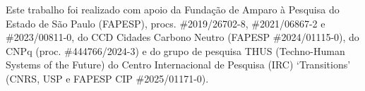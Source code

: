 \documentclass[12pt]{article}
\begin{document}
Este trabalho foi realizado com apoio da Fundação de Amparo à Pesquisa do Estado de São Paulo (FAPESP), procs. \mbox{\#2019/26702-8}, \mbox{\#2021/06867-2} e \mbox{\#2023/00811-0}, do CCD Cidades Carbono Neutro (FAPESP \mbox{\#2024/01115-0}), do CNPq (proc. \mbox{\#444766/2024-3}) e do grupo de pesquisa THUS (Techno-Human Systems of the Future) do Centro Internacional de Pesquisa (IRC) `Transitions' (CNRS, USP e FAPESP CIP \mbox{\#2025/01171-0}).

\renewcommand{\refname}{Referências}


\end{document}
